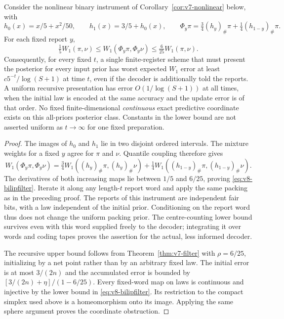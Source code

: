 \begin{corollary}
\label{cor:v8-nonlinear}
Consider the nonlinear binary instrument of Corollary~\ref{cor:v7-nonlinear}
below, with
\[
 h_0(x)=x/5+x^2/50,\qquad h_1(x)=3/5+h_0(x),\qquad
 \Phi_y\pi=\tfrac34(h_y)_\#\pi+\tfrac14(h_{1-y})_\#\pi.
\]
For each fixed report $y$,
\begin{equation}
 \tfrac15W_1(\pi,\nu)\le W_1(\Phi_y\pi,\Phi_y\nu)
                      \le\tfrac6{25}W_1(\pi,\nu).     \label{eq:v8-bilipfilter}
\end{equation}
Consequently, for every fixed $t$, a single finite-register scheme that
must present the posterior for every input prior has worst expected
$W_1$ error at least $c5^{-t}/\log(S+1)$ at time $t$, even if the decoder
is additionally told the reports. A uniform recursive presentation has
error $O(1/\log(S+1))$ at all times, when the initial law is encoded at
the same accuracy and the update error is of that order. No fixed
finite-dimensional \emph{continuous} exact predictive coordinate exists
on this all-priors posterior class. Constants in the lower bound are
not asserted uniform as $t\to\infty$ for one fixed preparation.
\end{corollary}
\begin{proof}
The images of $h_0$ and $h_1$ lie in two disjoint ordered intervals.
The mixture weights for a fixed $y$ agree for $\pi$ and $\nu$.
Quantile coupling therefore gives
\[
 W_1(\Phi_y\pi,\Phi_y\nu)
 =\tfrac34 W_1((h_y)_\#\pi,(h_y)_\#\nu)
  +\tfrac14 W_1((h_{1-y})_\#\pi,(h_{1-y})_\#\nu).
\]
The derivatives of both increasing maps lie between $1/5$ and $6/25$,
proving \eqref{eq:v8-bilipfilter}. Iterate it along any length-$t$
report word and apply the same packing as in the preceding proof.
The reports of this instrument are independent fair bits, with a law
independent of the initial prior. Conditioning on the report word thus
does not change the uniform packing prior. The centre-counting lower
bound survives even with this word supplied freely to the decoder;
integrating it over words and coding tapes proves the assertion for
the actual, less informed decoder.

The recursive upper bound follows from Theorem~\ref{thm:v7-filter} with
$\rho=6/25$, initializing by a net point rather than by an arbitrary
fixed law. The initial error is at most $3/(2n)$ and the accumulated
error is bounded by $[3/(2n)+\eta]/(1-6/25)$.
Every fixed-word map on laws is continuous and injective by the lower
bound in \eqref{eq:v8-bilipfilter}. Its restriction to the compact
simplex used above is a homeomorphism onto its image. Applying the
same sphere argument proves the coordinate obstruction.
\end{proof}

